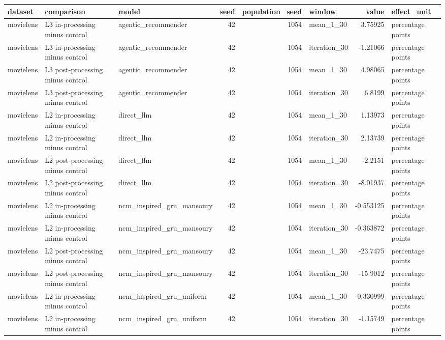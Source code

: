 \begin{table}[htbp!]
\centering
\small
\setlength{\tabcolsep}{3pt}
\renewcommand{\arraystretch}{1.1}
\begin{tabular}{lllrrlrl}
\hline
dataset & comparison & model & seed & population\_seed & window & value & effect\_unit \\
\hline
movielens & L3 in-processing minus control & agentic\_recommender & 42 & 1054 & mean\_1\_30 & 3.75925 & percentage points \\
movielens & L3 in-processing minus control & agentic\_recommender & 42 & 1054 & iteration\_30 & -1.21066 & percentage points \\
movielens & L3 post-processing minus control & agentic\_recommender & 42 & 1054 & mean\_1\_30 & 4.98065 & percentage points \\
movielens & L3 post-processing minus control & agentic\_recommender & 42 & 1054 & iteration\_30 & 6.8199 & percentage points \\
movielens & L2 in-processing minus control & direct\_llm & 42 & 1054 & mean\_1\_30 & 1.13973 & percentage points \\
movielens & L2 in-processing minus control & direct\_llm & 42 & 1054 & iteration\_30 & 2.13739 & percentage points \\
movielens & L2 post-processing minus control & direct\_llm & 42 & 1054 & mean\_1\_30 & -2.2151 & percentage points \\
movielens & L2 post-processing minus control & direct\_llm & 42 & 1054 & iteration\_30 & -8.01937 & percentage points \\
movielens & L2 in-processing minus control & ncm\_inspired\_gru\_mansoury & 42 & 1054 & mean\_1\_30 & -0.553125 & percentage points \\
movielens & L2 in-processing minus control & ncm\_inspired\_gru\_mansoury & 42 & 1054 & iteration\_30 & -0.363872 & percentage points \\
movielens & L2 post-processing minus control & ncm\_inspired\_gru\_mansoury & 42 & 1054 & mean\_1\_30 & -23.7475 & percentage points \\
movielens & L2 post-processing minus control & ncm\_inspired\_gru\_mansoury & 42 & 1054 & iteration\_30 & -15.9012 & percentage points \\
movielens & L2 in-processing minus control & ncm\_inspired\_gru\_uniform & 42 & 1054 & mean\_1\_30 & -0.330999 & percentage points \\
movielens & L2 in-processing minus control & ncm\_inspired\_gru\_uniform & 42 & 1054 & iteration\_30 & -1.15749 & percentage points \\

\end{tabular}
\end{table}
